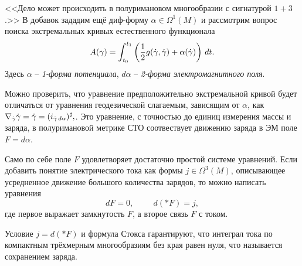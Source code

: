 <<Дело может происходить в полуримановом многообразии с сигнатурой $1+3$.>> В добавок зададим ещё диф-форму $\alpha \in \Omega^1 (M)$ и рассмотрим вопрос поиска экстремальных кривых естественного функционала
\begin{equation*}
    A(\gamma) = \int_{t_0}^{t_1} \left(
        \frac{1}{2} g(\dot{\gamma}, \dot{\gamma}) + \alpha(\dot{\gamma})
    \right) \, d t.
\end{equation*}
Здесь $\alpha$ -- \textit{1-форма потенциала}, $d \alpha$ -- \textit{2-форма электромагнитного поля}.

Можно проверить, что уравнение предположительно экстремальной кривой будет отличаться от уравнения геодезической слагаемым, зависящим от $\alpha$, как $\nabla_{\dot{\gamma}} \dot{\gamma} = \ddot{\gamma} =
    (i_{\dot{\gamma} \, d \alpha})^\sharp,
$.
Это уравнение, с точностью до единиц измерения массы и заряда, в полуримановой метрике СТО соотвествует движению заряда в ЭМ поле $F = d \alpha$.

Само по себе поле $F$ удовлетворяет достаточно простой системе уравнений. Если добавить понятие электрического тока как формы $j \in \Omega^3(M)$, описывающее усредненное движение большого количества зарядов, то можно написать уравнения
\begin{equation*}
    d F = 0, \hspace{1cm} 
    d(*F) = j,
\end{equation*}
где первое выражает замкнутость $F$, а второе связь $F$ с током.

Условие $j = d(*F)$ и формула Стокса гарантируют, что интеграл тока по компактным трёхмерным многообразиям без края равен нуля, что называется сохранением заряда.




